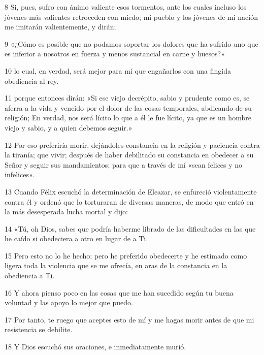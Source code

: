 \par 8 Si, pues, sufro con ánimo valiente esos tormentos, ante los cuales incluso los jóvenes más valientes retroceden con miedo; mi pueblo y los jóvenes de mi nación me imitarán valientemente, y dirán;

\par 9 «¿Cómo es posible que no podamos soportar los dolores que ha sufrido uno que es inferior a nosotros en fuerza y ​​menos sustancial en carne y huesos?»

\par 10 lo cual, en verdad, será mejor para mí que engañarlos con una fingida obediencia al rey.

\par 11 porque entonces dirán: «Si ese viejo decrépito, sabio y prudente como es, se aferra a la vida y vencido por el dolor de las cosas temporales, abdicando de su religión; En verdad, nos será lícito lo que a él le fue lícito, ya que es un hombre viejo y sabio, y a quien debemos seguir.»

\par 12 Por eso preferiría morir, dejándoles constancia en la religión y paciencia contra la tiranía; que vivir; después de haber debilitado su constancia en obedecer a su Señor y seguir sus mandamientos; para que a través de mí «sean felices y no infelices».

\par 13 Cuando Félix escuchó la determinación de Eleazar, se enfureció violentamente contra él y ordenó que lo torturaran de diversas maneras, de modo que entró en la más desesperada lucha mortal y dijo:

\par 14 «Tú, oh Dios, sabes que podría haberme librado de las dificultades en las que he caído si obedeciera a otro en lugar de a Ti.

\par 15 Pero esto no lo he hecho; pero he preferido obedecerte y he estimado como ligera toda la violencia que se me ofrecía, en aras de la constancia en la obediencia a Ti.

\par 16 Y ahora pienso poco en las cosas que me han sucedido según tu buena voluntad y las apoyo lo mejor que puedo.

\par 17 Por tanto, te ruego que aceptes esto de mí y me hagas morir antes de que mi resistencia se debilite.

\par 18 Y Dios escuchó sus oraciones, e inmediatamente murió.


